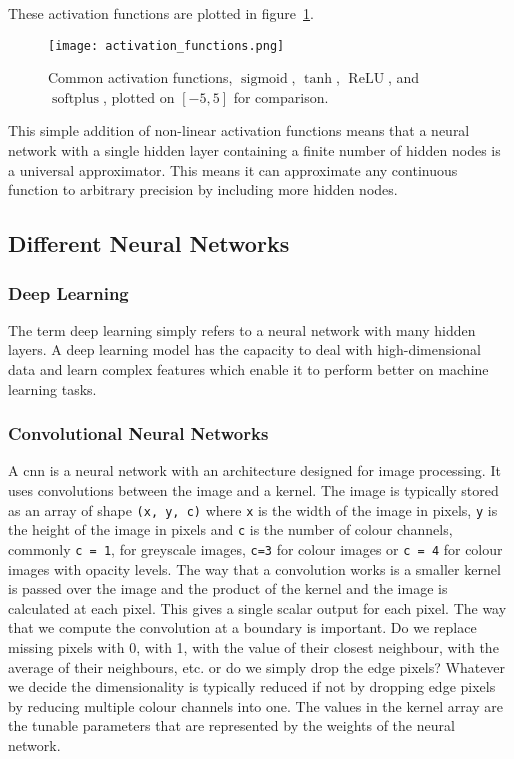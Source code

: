 \documentclass[a4paper]{article}
\begin{document}
    These activation functions are plotted in figure~\ref{fig:activation functions}.
    \begin{figure}[ht]
        \centering
        \texttt{[image: activation\_functions.png]}
        \caption{Common activation functions, \(\operatorname{sigmoid}\), \(\tanh\), \(\operatorname{ReLU}\), and \(\operatorname{softplus}\), plotted on \([-5, 5]\) for comparison.}
        \label{fig:activation functions}
    \end{figure}
    This simple addition of non-linear activation functions means that a neural network with a single hidden layer containing a finite number of hidden nodes is a universal approximator.
    This means it can approximate any continuous function to arbitrary precision by including more hidden nodes.
    
    \subsection{Different Neural Networks}
    \subsubsection{Deep Learning}
    The term deep learning simply refers to a neural network with many hidden layers.
    A deep learning model has the capacity to deal with high-dimensional data and learn complex features which enable it to perform better on machine learning tasks.
    
    \subsubsection{Convolutional Neural Networks}
    A \gls{cnn} is a neural network with an architecture designed for image processing.
    It uses convolutions between the image and a kernel.
    The image is typically stored as an array of shape \lstinline|(x, y, c)| where \lstinline|x| is the width of the image in pixels, \lstinline|y| is the height of the image in pixels and \lstinline|c| is the number of colour channels, commonly \lstinline|c = 1|, for greyscale images, \lstinline|c=3| for colour images or \lstinline|c = 4| for colour images with opacity levels.
    The way that a convolution works is a smaller kernel is passed over the image and the product of the kernel and the image is calculated at each pixel.
    This gives a single scalar output for each pixel.
    The way that we compute the convolution at a boundary is important.
    Do we replace missing pixels with 0, with 1, with the value of their closest neighbour, with the average of their neighbours, etc. or do we simply drop the edge pixels?
    Whatever we decide the dimensionality is typically reduced if not by dropping edge pixels by reducing multiple colour channels into one.
    The values in the kernel array are the tunable parameters that are represented by the weights of the neural network.
    
\end{document}
